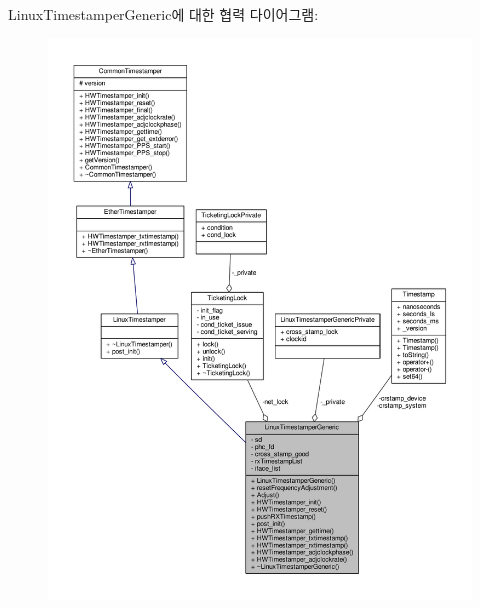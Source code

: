 Linux\+Timestamper\+Generic에 대한 협력 다이어그램\+:
\nopagebreak
\begin{figure}[H]
\begin{center}
\leavevmode
\includegraphics[width=350pt]{class_linux_timestamper_generic__coll__graph}
\end{center}
\end{figure}
